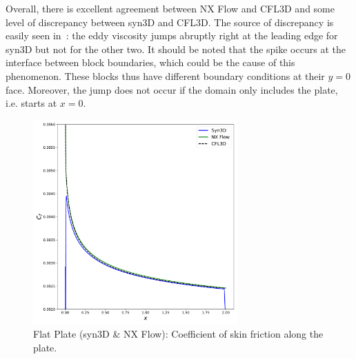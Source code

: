 Overall, there is excellent agreement between NX Flow and CFL3D and some level of discrepancy between syn3D and CFL3D. The source of discrepancy is easily seen in~: the eddy viscosity jumps abruptly right at the leading edge for syn3D but not for the other two. It should be noted that the spike occurs at the interface between block boundaries, which could be the cause of this phenomenon. These blocks thus have different boundary conditions at their $y=0$ face. Moreover, the jump does not occur if the domain only includes the plate, i.e. starts at $x=0$.
\begin{figure}[ht!]
\centering
	\includegraphics[width=0.7\textwidth]{figs/flat/skin_friction.pdf}
    \caption{Flat Plate (syn3D \& NX Flow): Coefficient of skin friction along the plate.}
    \label{fig:flatcf}
\end{figure}

